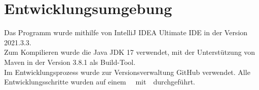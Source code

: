 \chapter{Entwicklungsumgebung}\label{ch:entwicklungsumgebung}
Das Programm wurde mithilfe von IntelliJ IDEA Ultimate IDE in der Version 2021.3.3.\\
Zum Kompilieren wurde die Java JDK 17 verwendet, mit der Unterstützung von Maven in der Version 3.8.1 als Build-Tool.\\
Im Entwicklungsprozess wurde zur Versionsverwaltung GitHub verwendet.
Alle Entwicklungsschritte wurden auf einem ~\Rechner~mit~\Betriebssystem~durchgeführt.
